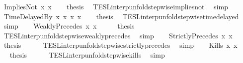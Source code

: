 \begin{isabellebody}
\ {\isacharparenleft}ImpliesNot\ x{}{}\ x{}{}{\isacharparenright}\isanewline
\ \ \isamarkupfalse%
\ {\isacharquery}thesis\ \isamarkupfalse%
\ TESL{\isacharunderscore}interp{\isacharunderscore}unfold{\isacharunderscore}stepwise{\isacharunderscore}implies{\isacharunderscore}not\ \isamarkupfalse%
\ simp\isanewline
{}\isamarkupfalse%
\isanewline
\ \ \isamarkupfalse%
\ {\isacharparenleft}TimeDelayedBy\ x{}{}\ x{}{}\ x{}{}\ x{}{}{\isacharparenright}\isanewline
\ \ \isamarkupfalse%
\ {\isacharquery}thesis\ \isamarkupfalse%
\ TESL{\isacharunderscore}interp{\isacharunderscore}unfold{\isacharunderscore}stepwise{\isacharunderscore}timedelayed\ \isamarkupfalse%
\ simp\isanewline
{}\isamarkupfalse%
\isanewline
\ \ \isamarkupfalse%
\ {\isacharparenleft}WeaklyPrecedes\ x{}{}\ x{}{}{\isacharparenright}\isanewline
\ \ \isamarkupfalse%
\ \isamarkupfalse%
\ {\isacharquery}thesis\isanewline
\ \ \ \ \isamarkupfalse%
\ TESL{\isacharunderscore}interp{\isacharunderscore}unfold{\isacharunderscore}stepwise{\isacharunderscore}weakly{\isacharunderscore}precedes\ \isamarkupfalse%
\ simp\isanewline
{}\isamarkupfalse%
\isanewline
\ \ \isamarkupfalse%
\ {\isacharparenleft}StrictlyPrecedes\ x{}{}\ x{}{}{\isacharparenright}\isanewline
\ \ \isamarkupfalse%
\ \isamarkupfalse%
\ {\isacharquery}thesis\isanewline
\ \ \ \ \isamarkupfalse%
\ TESL{\isacharunderscore}interp{\isacharunderscore}unfold{\isacharunderscore}stepwise{\isacharunderscore}strictly{\isacharunderscore}precedes\ \isamarkupfalse%
\ simp\isanewline
{}\isamarkupfalse%
\isanewline
\ \ \isamarkupfalse%
\ {\isacharparenleft}Kills\ x{}{}\ x{}{}{\isacharparenright}\isanewline
\ \ \isamarkupfalse%
\ \isamarkupfalse%
\ {\isacharquery}thesis\isanewline
\ \ \ \ \isamarkupfalse%
\ TESL{\isacharunderscore}interp{\isacharunderscore}unfold{\isacharunderscore}stepwise{\isacharunderscore}kills\ \isamarkupfalse%
\ simp\isanewline
{}\isamarkupfalse%

\end{isabellebody}
